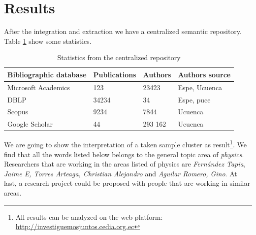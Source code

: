 \documentclass[11pt]{article}
\begin{document}
\section{Results}
\label{label:results}


After the integration and extraction we have a centralized semantic repository. Table \ref{table:statistics} show some statistics.

\begin{table}[htbp]
\begin{center}
\begin{tabular}{|l|l|l|l|}
\hline
Bibliographic database & Publications & Authors &  Authors source \\
\hline \hline
Microsoft Academics & 123  & 23423 & Espe, Ucuenca \\ \hline
DBLP & 34234 & 34 &  Espe, puce \\ \hline
Scopus &  9234 & 7844 & Ucuenca \\ \hline
Google Scholar & 44 & 293 162 & Ucuenca \\ \hline
\end{tabular}
\caption{Statistics from the centralized repository}
\label{table:statistics}
\end{center}
\end{table}


We are going to show the interpretation of a taken sample cluster  as result\footnote{All results can be analyzed on the web platform: \url{http://investiguemosjuntos.cedia.org.ec}}. We find that all the words listed below belongs to the general topic area of \emph{physics}. Researchers that are working in the areas listed of physics are \emph{Fern\'andez Tapia, Jaime E, Torres Arteaga, Christian Alejandro} and \emph{Aguilar Romero, Gino}. At last, a research project could be proposed with people that are working in similar areas. 
\end{document}
